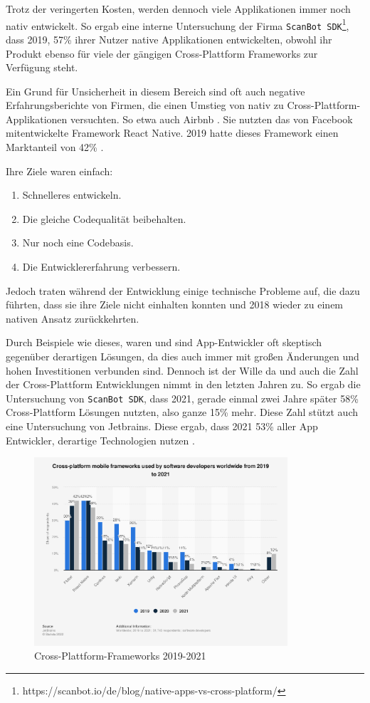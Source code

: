 Trotz der veringerten Kosten, werden dennoch viele Applikationen immer noch nativ entwickelt. So ergab eine interne Untersuchung der Firma \verb|ScanBot SDK|\footnote{https://scanbot.io/de/blog/native-apps-vs-cross-platform/}, dass 2019, 57\% ihrer Nutzer native Applikationen entwickelten, obwohl ihr Produkt ebenso für viele der gängigen Cross-Plattform Frameworks zur Verfügung steht.

Ein Grund für Unsicherheit in diesem Bereich sind oft auch negative Erfahrungsberichte von Firmen, die einen Umstieg von nativ zu Cross-Plattform-Applikationen versuchten.  So etwa auch Airbnb \cite{Airbnb_react_goals}. Sie nutzten das von Facebook mitentwickelte Framework React Native. 2019 hatte dieses Framework einen Marktanteil von 42\% \cite{statist_CP_Framework}. 

Ihre Ziele waren einfach:
\begin{enumerate}
    \item Schnelleres entwickeln.
    \item Die gleiche Codequalität beibehalten.
    \item Nur noch eine Codebasis.
    \item Die Entwicklererfahrung verbessern.
\end{enumerate}
Jedoch traten während der Entwicklung einige technische Probleme auf, die dazu führten, dass sie ihre Ziele nicht einhalten konnten und 2018 wieder zu einem nativen Ansatz zurückkehrten.

Durch Beispiele wie dieses, waren und sind App-Entwickler oft skeptisch gegenüber derartigen Lösungen, da dies auch immer mit großen Änderungen und hohen Investitionen verbunden sind. Dennoch ist der Wille da und auch die Zahl der Cross-Plattform Entwicklungen nimmt in den letzten Jahren zu. So ergab die Untersuchung von \verb|ScanBot SDK|, dass 2021, gerade einmal zwei Jahre später 58\% Cross-Plattform Lösungen nutzten, also ganze 15\% mehr. Diese Zahl stützt auch eine Untersuchung von Jetbrains. Diese ergab, dass 2021 53\% aller App Entwickler, derartige Technologien nutzen \cite{JetBrains_miscellaneous_2021}.

\begin{figure}[ht]
  \centering
  \includegraphics[height=7cm,keepaspectratio]{images/cross-platform-mobile-frameworks.png} 
  \caption[Statistik Cross-Plattform-Frameworks]{Cross-Plattform-Frameworks 2019-2021 \cite{statist_CP_Framework}}
  \label{fig:statista_cross_plattform}
\end{figure}

